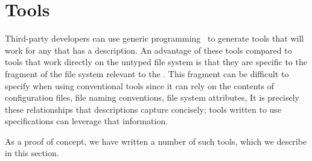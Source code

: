 \section{Tools}
\label{sec:tools}
Third-party developers can use generic programming~\cite{Lammel+:syb} to
generate tools that will work for any \filestore{} that has a
\forest{} description.  An advantage of these tools compared to tools
that work directly on the untyped file system is that they are
specific to the fragment of the file system relevant to the
\filestore{}.  This fragment can be difficult to specify when using
conventional tools since it can rely on the contents of configuration
files, file naming conventions, file system attributes, \etc\/
It is precisely these relationships that \forest{} descriptions
capture concisely; tools written to use \forest{} specifications 
can leverage that information.

As a proof of concept, we have written a
number of such tools, which we describe in this section.  

